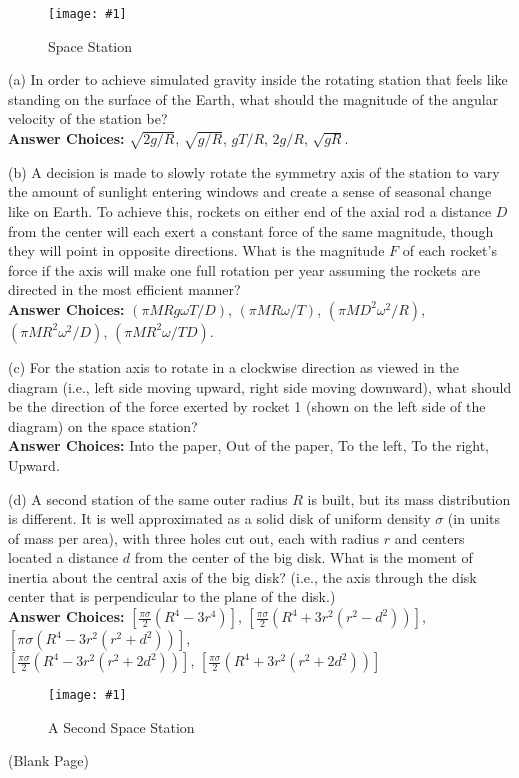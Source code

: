 \documentclass[11pt]{article}
\newcommand{\fig}[4]{
    \begin{figure}[H]
        \centering
        \texttt{[image: \#1]}
        \caption{#2}
        \label{exp4fit}
    \end{figure}
}
\theoremstyle{gangnamstyle}{\newtheorem{definition}{Definition}[]}
\theoremstyle{gangnamstyle}{\newtheorem{example}{Example}[]}
\theoremstyle{gangnamstyle}{\newtheorem{problem}{Problem}[]}
\begin{document}
\fig{figs/0805/dewese1.png}{Space Station}{0.45}{0}

(a) In order to achieve simulated gravity inside the rotating station that feels like standing on the surface of the Earth, what should the magnitude of the angular velocity of the station be? \\
\textbf{Answer Choices:} $\sqrt{2g/R}$, $\sqrt{g/R}$, $gT/R$, $2g/R$, $\sqrt{gR}$. 

(b) A decision is made to slowly rotate the symmetry axis of the station to vary the amount of sunlight entering windows and create a sense of seasonal change like on Earth. To achieve this, rockets on either end of the axial rod a distance $D$ from the center will each exert a constant force of the same magnitude, though they will point in opposite directions. What is the magnitude $F$ of each rocket’s force if the axis will make one full rotation per year assuming the rockets are directed in the most efficient manner? \\
\textbf{Answer Choices:} $(\pi MRg\omega T/D)$, $(\pi MR\omega/T)$, $(\pi MD^2\omega^2/R)$, $(\pi MR^2\omega^2/D)$, $(\pi MR^2\omega/TD)$. 

(c) For the station axis to rotate in a clockwise direction as viewed in the diagram (i.e., left side moving upward, right side moving downward), what should be the direction of the force exerted by rocket 1 (shown on the left side of the diagram) on the space station? \\
\textbf{Answer Choices:} Into the paper, Out of the paper, To the left, To the right, Upward. 

(d) A second station of the same outer radius $R$ is built, but its mass distribution is different. It is well approximated as a solid disk of uniform density $\sigma$ (in units of mass per area), with three holes cut out, each with radius $r$ and centers located a distance $d$ from the center of the big disk. What is the moment of inertia about the central axis of the big disk? (i.e., the axis through the disk center that is perpendicular to the plane of the disk.) \\
\textbf{Answer Choices:} $[\frac{\pi\sigma}{2}(R^4 - 3r^4)]$, $[\frac{\pi\sigma}{2}(R^4 + 3r^2(r^2 - d^2))]$, $[\pi\sigma(R^4 - 3r^2(r^2 + d^2))]$, \\ $[\frac{\pi\sigma}{2}(R^4 - 3r^2(r^2 + 2d^2))]$, $[\frac{\pi\sigma}{2}(R^4 + 3r^2(r^2 + 2d^2))]$

\fig{figs/0805/deweese1.png}{A Second Space Station}{0.5}{0}

\pagebreak

\begin{center}
(Blank Page)
\end{center}

\pagebreak
\end{document}
